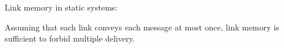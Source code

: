 \documentclass[10pt, xcolor={usenames, dvipsnames}]{beamer}
\newcommand{\cmark}{\ding{51}}
\newcommand{\YES}[1]{\textcolor{green}{#1}}
\begin{document}
\begin{frame}{Link memory in static systems: \YES{\cmark}}
  \vspace{1em}

  \begin{theorem}
    Assuming that each link conveys each message at most once, link memory is
    sufficient to forbid multiple delivery.
  \end{theorem}

\end{frame}


  


%         
%         
%         
%     



\end{document}
